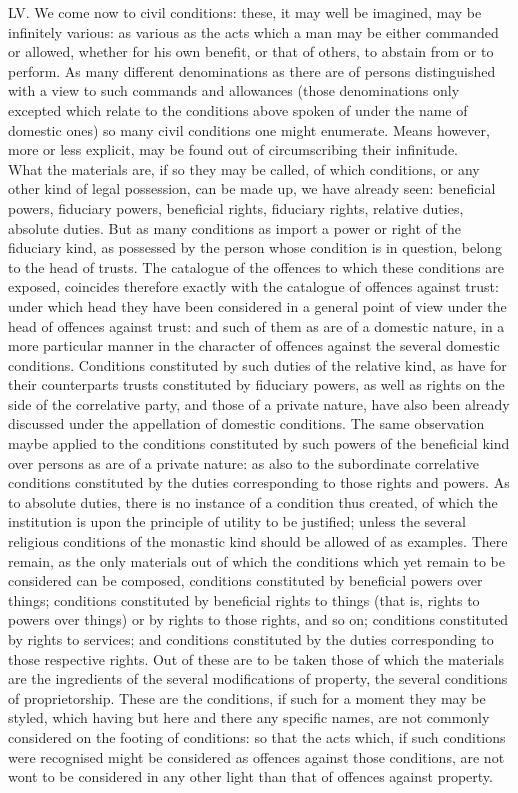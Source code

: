 \documentclass[12pt]{report}
\begin{document}
LV. We come now to civil conditions: these, it may well be imagined, may
be infinitely various: as various as the acts which a man may be either
commanded or allowed, whether for his own benefit, or that of others, to
abstain from or to perform. As many different denominations as there are
of persons distinguished with a view to such commands and allowances
(those denominations only excepted which relate to the conditions above
spoken of under the name of domestic ones) so many civil conditions one
might enumerate. Means however, more or less explicit, may be found out
of circumscribing their infinitude.\\
What the materials are, if so they may be called, of which conditions,
or any other kind of legal possession, can be made up, we have already
seen: beneficial powers, fiduciary powers, beneficial rights, fiduciary
rights, relative duties, absolute duties. But as many conditions as
import a power or right of the fiduciary kind, as possessed by the
person whose condition is in question, belong to the head of trusts. The
catalogue of the offences to which these conditions are exposed,
coincides therefore exactly with the catalogue of offences against
trust: under which head they have been considered in a general point of
view under the head of offences against trust: and such of them as are
of a domestic nature, in a more particular manner in the character of
offences against the several domestic conditions. Conditions constituted
by such duties of the relative kind, as have for their counterparts
trusts constituted by fiduciary powers, as well as rights on the side of
the correlative party, and those of a private nature, have also been
already discussed under the appellation of domestic conditions. The same
observation maybe applied to the conditions constituted by such powers
of the beneficial kind over persons as are of a private nature: as also
to the subordinate correlative conditions constituted by the duties
corresponding to those rights and powers. As to absolute duties, there
is no instance of a condition thus created, of which the institution is
upon the principle of utility to be justified; unless the several
religious conditions of the monastic kind should be allowed of as
examples. There remain, as the only materials out of which the
conditions which yet remain to be considered can be composed, conditions
constituted by beneficial powers over things; conditions constituted by
beneficial rights to things (that is, rights to powers over things) or
by rights to those rights, and so on; conditions constituted by rights
to services; and conditions constituted by the duties corresponding to
those respective rights. Out of these are to be taken those of which the
materials are the ingredients of the several modifications of property,
the several conditions of proprietorship. These are the conditions, if
such for a moment they may be styled, which having but here and there
any specific names, are not commonly considered on the footing of
conditions: so that the acts which, if such conditions were recognised
might be considered as offences against those conditions, are not wont
to be considered in any other light than that of offences against
property.
\end{document}
